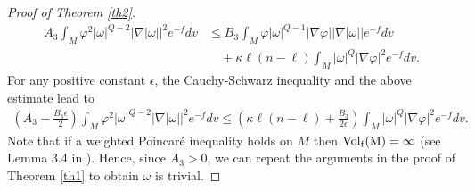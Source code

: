 \documentclass[leqno,12pt]{article} %
\theoremstyle{plain} %
\theoremstyle{definition} %
\numberwithin{equation}{section}
\begin{document}
\begin{proof}[Proof of Theorem \ref{th2}]
	\begin{align}\nonumber
		A_3 \int_M \varphi^2 |\omega|^{Q-2}|\nabla|\omega||^2 e^{-f}dv &\le B_3 \int_M \varphi |\omega|^{Q-1} |\nabla \varphi||\nabla|\omega||e^{-f}dv\\ \nonumber
		&\quad+\kappa \ell (n-\ell) \int_M |\omega|^Q |\nabla \varphi|^2 e^{-f}dv.
	\end{align}
	For any positive constant $\epsilon$, the Cauchy-Schwarz inequality and the above estimate lead to
	\begin{align} \nonumber
		\left(A_3-\frac{B_3 \epsilon}{2}\right) \int_M \varphi^2 |\omega|^{Q-2}|\nabla|\omega||^2 e^{-f}dv \le \left(\kappa \ell (n-\ell)+\frac{B_3 }{2\epsilon} \right) \int_M |\omega|^Q |\nabla \varphi|^2 e^{-f}dv.
	\end{align}
	Note that if a weighted Poincar\'e inequality holds on $M$ then $\rm{Vol}_f(M)=\infty$ (see Lemma 3.4 in \cite{DDH25}).  Hence, since $A_3>0$, we can repeat the arguments in the proof of Theorem \ref{th1} to obtain $\omega$ is trivial.
	

\end{proof}
\end{document}
